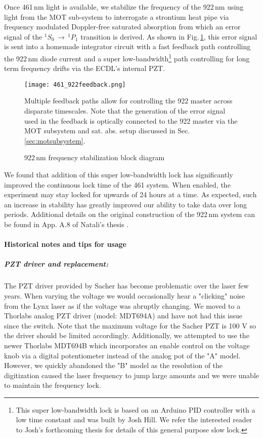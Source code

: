 Once 461\,nm light is available, we stabilize the frequency of the 922\,nm using light from the MOT sub-system to interrogate a strontium heat pipe via frequency modulated Doppler-free saturated absorption from which an error signal of the $^1S_0\,\rightarrow\,^1P_1$ transition is derived.
As shown in Fig.\,\ref{fig:922freqLock}, this error signal is sent into a homemade integrator circuit with a fast feedback path controlling the 922\,nm diode current and a super low-bandwidth\footnote{This super low-bandwidth lock is based on an Arduino PID controller with a low time constant and was built by Josh Hill.
We refer the interested reader to Josh's forthcoming thesis for details of this general purpose slow lock.} 
path controlling for long term frequency drifts via the ECDL's internal PZT.
	\begin{figure}
		\centerline{
		\texttt{[image: 461\_922feedback.png]}}
		\caption{922\,nm frequency stabilization block diagram}{Multiple feedback paths allow for controlling the 922 master across disparate timescales. Note that the generation of the error signal used in the feedback is optically connected to the 922 master via the MOT subsystem and sat. abs. setup discussed in Sec.\,\ref{sec:motsubsystem}.}
		\label{fig:922freqLock}
	\end{figure} 
We found that addition of this super low-bandwidth lock has significantly improved the continuous lock time of the 461 system. 
When enabled, the experiment may stay locked for upwards of 24 hours at a time. 
As expected, such an increase in stability has greatly improved our ability to take data over long periods.
Additional details on the original construction of the 922\,nm system can be found in App. A.8 of Natali's thesis \cite{MartinezdeEscolar2010}.

\paragraph{Historical notes and tips for usage}
\subparagraph{PZT driver and replacement:}
The PZT driver provided by Sacher has become problematic over the laser few years.
When varying the voltage we would occasionally hear a "clicking" noise from the Lynx laser as if the voltage was abruptly changing.
We moved to a Thorlabs analog PZT driver (model: MDT694A) and have not had this issue since the switch.
Note that the maximum voltage for the Sacher PZT is 100 V so the driver should be limited accordingly.
Additionally, we attempted to use the newer Thorlabs MDT694B which incorporates an enable control on the voltage knob via a digital potentiometer instead of the analog pot of the "A" model.
However, we quickly abandoned the "B" model as the resolution of the digitization caused the laser frequency to jump large amounts and we were unable to maintain the frequency lock.

